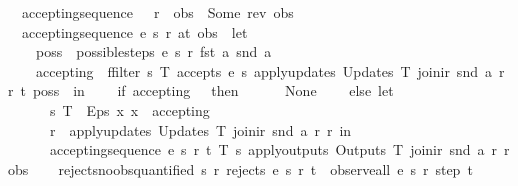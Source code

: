 \begin{isabellebody}
\ \ {\isachardoublequoteopen}accepting{\isacharunderscore}sequence\ {\isacharunderscore}\ {\isacharunderscore}\ r\ {\isacharbrackleft}{\isacharbrackright}\ obs\ {\isacharequal}\ Some\ {\isacharparenleft}rev\ obs{\isacharparenright}{\isachardoublequoteclose}\ {\isacharbar}\isanewline
\ \ {\isachardoublequoteopen}accepting{\isacharunderscore}sequence\ e\ s\ r\ {\isacharparenleft}a{\isacharhash}t{\isacharparenright}\ obs\ {\isacharequal}\ {\isacharparenleft}let\isanewline
\ \ \ \ poss\ {\isacharequal}\ possible{\isacharunderscore}steps\ e\ s\ r\ {\isacharparenleft}fst\ a{\isacharparenright}\ {\isacharparenleft}snd\ a{\isacharparenright}{\isacharsemicolon}\isanewline
\ \ \ \ accepting\ {\isacharequal}\ ffilter\ {\isacharparenleft}{\isasymlambda}{\isacharparenleft}s{\isacharprime}{\isacharcomma}\ T{\isacharparenright}{\isachardot}\ accepts\ e\ s{\isacharprime}\ {\isacharparenleft}apply{\isacharunderscore}updates\ {\isacharparenleft}Updates\ T{\isacharparenright}\ {\isacharparenleft}join{\isacharunderscore}ir\ {\isacharparenleft}snd\ a{\isacharparenright}\ r{\isacharparenright}\ r{\isacharparenright}\ t{\isacharparenright}\ poss\ \ in\isanewline
\ \ \ \ if\ accepting\ {\isacharequal}\ {\isacharbraceleft}{\isacharbar}{\isacharbar}{\isacharbraceright}\ then\isanewline
\ \ \ \ \ \ None\isanewline
\ \ \ \ else\ let\isanewline
\ \ \ \ \ \ {\isacharparenleft}s{\isacharprime}{\isacharcomma}\ T{\isacharparenright}\ {\isacharequal}\ Eps\ {\isacharparenleft}{\isasymlambda}x{\isachardot}\ x\ {\isacharbar}{\isasymin}{\isacharbar}\ accepting{\isacharparenright}{\isacharsemicolon}\isanewline
\ \ \ \ \ \ r{\isacharprime}\ {\isacharequal}\ {\isacharparenleft}apply{\isacharunderscore}updates\ {\isacharparenleft}Updates\ T{\isacharparenright}\ {\isacharparenleft}join{\isacharunderscore}ir\ {\isacharparenleft}snd\ a{\isacharparenright}\ r{\isacharparenright}\ r{\isacharparenright}\ in\isanewline
\ \ \ \ \ \ accepting{\isacharunderscore}sequence\ e\ s{\isacharprime}\ r{\isacharprime}\ t\ {\isacharparenleft}{\isacharparenleft}T{\isacharcomma}\ s{\isacharprime}{\isacharcomma}\ {\isacharparenleft}apply{\isacharunderscore}outputs\ {\isacharparenleft}Outputs\ T{\isacharparenright}\ {\isacharparenleft}join{\isacharunderscore}ir\ {\isacharparenleft}snd\ a{\isacharparenright}\ r{\isacharparenright}{\isacharparenright}{\isacharcomma}\ r{\isacharprime}{\isacharparenright}{\isacharhash}obs{\isacharparenright}\isanewline
\ \ {\isacharparenright}{\isachardoublequoteclose}\isanewline
\isanewline
{}\isamarkupfalse%
\ rejects{\isacharunderscore}no{\isacharunderscore}obs{\isacharunderscore}quantified{\isacharcolon}\ {\isachardoublequoteopen}{\isasymforall}s\ r{\isachardot}\ rejects\ e\ s\ r\ t\ {\isasymlongrightarrow}\ observe{\isacharunderscore}all\ e\ s\ r\ step\ t\ {\isacharequal}\ {\isacharbrackleft}{\isacharbrackright}{\isachardoublequoteclose}\isanewline

\end{isabellebody}
